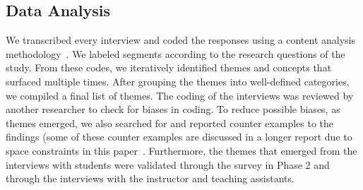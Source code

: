 \subsection{Data Analysis}
We transcribed every interview and coded the responses using a content analysis methodology~\cite{Charmaz2006}.
 We labeled segments according to the research questions of the study. From these codes, we iteratively identified themes and concepts that surfaced multiple times. After grouping the themes into well-defined categories, we compiled a final list of themes.  The coding of the interviews was reviewed by another researcher to check for biases in coding.  To reduce possible biases, as themes emerged, we also searched for and reported counter examples to the findings (some of these counter examples are discussed in a longer report due to space constraints in this paper~\cite{feliciano2015}. Furthermore, the themes that emerged from the interviews with students were validated through the survey in Phase 2 and through the interviews with the instructor and teaching assistants. 
